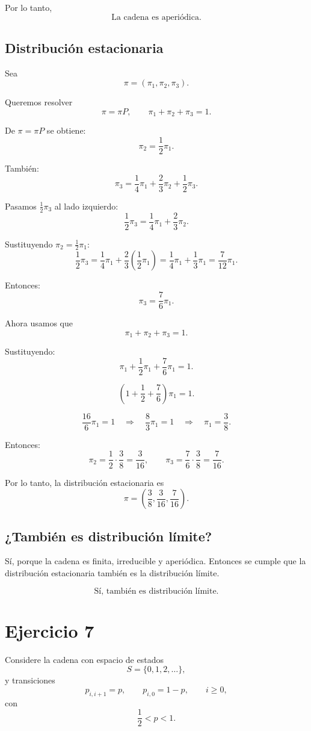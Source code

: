 \documentclass[12pt]{article}
\begin{document}
Por lo tanto,
\[
\boxed{\text{La cadena es aperiódica.}}
\]

\subsection*{Distribución estacionaria}

Sea
\[
\pi=(\pi_1,\pi_2,\pi_3).
\]

Queremos resolver
\[
\pi=\pi P,
\qquad
\pi_1+\pi_2+\pi_3=1.
\]

De \(\pi=\pi P\) se obtiene:
\[
\pi_2=\frac12\pi_1.
\]

También:
\[
\pi_3=\frac14\pi_1+\frac23\pi_2+\frac12\pi_3.
\]

Pasamos \(\frac12\pi_3\) al lado izquierdo:
\[
\frac12\pi_3=\frac14\pi_1+\frac23\pi_2.
\]

Sustituyendo \(\pi_2=\frac12\pi_1\):
\[
\frac12\pi_3=\frac14\pi_1+\frac23\left(\frac12\pi_1\right)
=\frac14\pi_1+\frac13\pi_1
=\frac{7}{12}\pi_1.
\]

Entonces:
\[
\pi_3=\frac76\pi_1.
\]

Ahora usamos que
\[
\pi_1+\pi_2+\pi_3=1.
\]

Sustituyendo:
\[
\pi_1+\frac12\pi_1+\frac76\pi_1=1.
\]

\[
\left(1+\frac12+\frac76\right)\pi_1=1.
\]

\[
\frac{16}{6}\pi_1=1
\quad\Longrightarrow\quad
\frac83\pi_1=1
\quad\Longrightarrow\quad
\pi_1=\frac38.
\]

Entonces:
\[
\pi_2=\frac12\cdot\frac38=\frac{3}{16},
\qquad
\pi_3=\frac76\cdot\frac38=\frac{7}{16}.
\]

Por lo tanto, la distribución estacionaria es
\[
\boxed{\pi=\left(\frac38,\frac{3}{16},\frac{7}{16}\right)}.
\]

\subsection*{¿También es distribución límite?}

Sí, porque la cadena es finita, irreducible y aperiódica. Entonces se cumple que la distribución estacionaria también es la distribución límite.

\[
\boxed{\text{Sí, también es distribución límite.}}
\]

\newpage
\section*{Ejercicio 7}

Considere la cadena con espacio de estados
\[
S=\{0,1,2,\dots\},
\]
y transiciones
\[
p_{i,i+1}=p,
\qquad
p_{i,0}=1-p,
\qquad i\geq 0,
\]
con
\[
\frac12<p<1.
\]
\end{document}

